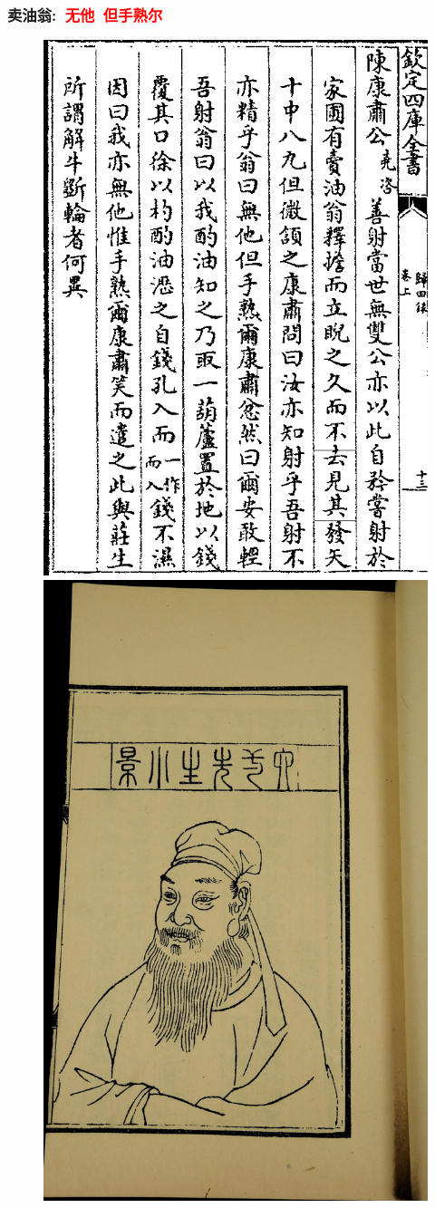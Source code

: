 \frame
{
	\frametitle{卖油翁:~\textcolor{red}{无他~但手熟尔}}
\begin{figure}[h!]
\centering
\vspace{-10.5pt}
\includegraphics[height=0.65\textwidth]{Figures/Sale_Oil_Ouyang.png}
\hspace{1pt}
\includegraphics[height=0.65\textwidth]{Figures/Ouyang_Xiu-2.jpg}
\caption{\fontsize{6.2pt}{5.2pt}\selectfont{欧阳修(1007-1072)~《欧阳文忠公文集$\cdot$归田录》~卷上}}
\label{Sale_oil}
\end{figure}
}

